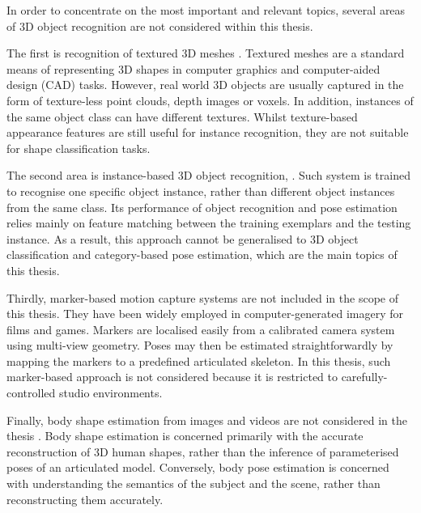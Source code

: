 In order to concentrate on the most important and relevant topics, several areas of 3D object recognition are not considered within this thesis. 

The first is recognition of textured 3D meshes \cite{Zaharescu2009, Bronstein2011, Kokkinos2012}. Textured meshes are a standard means of representing 3D shapes in computer graphics and computer-aided design (CAD) tasks. 
However, real world 3D objects are usually captured in the form of texture-less point clouds, depth images or voxels. 
In addition, instances of the same object class can have different textures. Whilst texture-based appearance features are still useful for instance recognition, they are not suitable for shape classification tasks.  

The second area is instance-based 3D object recognition, \eg \cite{Mian2006, Rothganger2006, Shang2010}. Such system is trained to recognise one specific object instance, rather than different object instances from the same class. Its performance of object recognition and pose estimation relies mainly on feature matching between the training exemplars and the testing instance. As a result, this approach cannot be generalised to 3D object classification and category-based pose estimation, which are the main topics of this thesis.    
   

Thirdly, marker-based motion capture systems are not included in the scope of this thesis. They have been widely employed in computer-generated imagery for films and games. Markers are localised easily from a calibrated camera system using multi-view geometry. Poses may then be estimated straightforwardly by mapping the markers to a predefined articulated skeleton. In this thesis, such marker-based approach is not considered because it is restricted to carefully-controlled studio environments.  
 
Finally, body shape estimation from images and videos are not considered in the thesis \cite{Guan2009, Rother2009, Chen2011}. 
Body shape estimation is concerned primarily with the accurate reconstruction of 3D human shapes, rather than the inference of parameterised poses of an articulated model. Conversely, body pose estimation is concerned with understanding the semantics of the subject and the scene, rather than reconstructing them accurately. 


